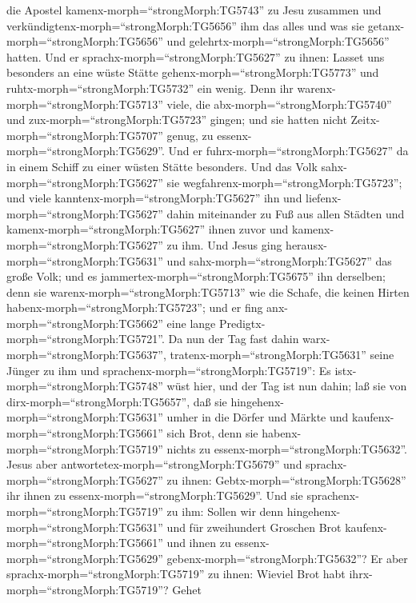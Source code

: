 die Apostel kamenx-morph=``strongMorph:TG5743'' zu Jesu zusammen und
verkündigtenx-morph=``strongMorph:TG5656'' ihm das alles und was sie
getanx-morph=``strongMorph:TG5656'' und
gelehrtx-morph=``strongMorph:TG5656'' hatten.  Und er
sprachx-morph=``strongMorph:TG5627'' zu ihnen: Lasset uns besonders an
eine wüste Stätte gehenx-morph=``strongMorph:TG5773'' und
ruhtx-morph=``strongMorph:TG5732'' ein wenig. Denn ihr
warenx-morph=``strongMorph:TG5713'' viele, die
abx-morph=``strongMorph:TG5740'' und zux-morph=``strongMorph:TG5723''
gingen; und sie hatten nicht Zeit\textbar x-morph=``strongMorph:TG5707''
genug, zu essenx-morph=``strongMorph:TG5629''.  Und er
fuhrx-morph=``strongMorph:TG5627'' da in einem Schiff zu einer wüsten
Stätte besonders.  Und das Volk
sahx-morph=``strongMorph:TG5627'' sie
wegfahrenx-morph=``strongMorph:TG5723''; und viele
kanntenx-morph=``strongMorph:TG5627'' ihn und
liefenx-morph=``strongMorph:TG5627'' dahin miteinander zu Fuß aus allen
Städten und kamenx-morph=``strongMorph:TG5627'' ihnen zuvor und
kamenx-morph=``strongMorph:TG5627'' zu ihm.  Und Jesus ging
herausx-morph=``strongMorph:TG5631'' und
sahx-morph=``strongMorph:TG5627'' das große Volk; und es
jammertex-morph=``strongMorph:TG5675'' ihn derselben; denn sie
warenx-morph=``strongMorph:TG5713'' wie die Schafe, die keinen Hirten
habenx-morph=``strongMorph:TG5723''; und er fing
anx-morph=``strongMorph:TG5662'' eine lange
Predigtx-morph=``strongMorph:TG5721''.  Da nun der Tag fast
dahin warx-morph=``strongMorph:TG5637'',
tratenx-morph=``strongMorph:TG5631'' seine Jünger zu ihm und
sprachenx-morph=``strongMorph:TG5719'': Es
istx-morph=``strongMorph:TG5748'' wüst hier, und der Tag ist nun dahin;
 laß sie von dirx-morph=``strongMorph:TG5657'', daß sie
hingehenx-morph=``strongMorph:TG5631'' umher in die Dörfer und Märkte
und kaufenx-morph=``strongMorph:TG5661'' sich Brot, denn sie
habenx-morph=``strongMorph:TG5719'' nichts zu
essenx-morph=``strongMorph:TG5632''.  Jesus aber
antwortetex-morph=``strongMorph:TG5679'' und
sprachx-morph=``strongMorph:TG5627'' zu ihnen:
Gebtx-morph=``strongMorph:TG5628'' ihr ihnen zu
essenx-morph=``strongMorph:TG5629''. Und sie
sprachenx-morph=``strongMorph:TG5719'' zu ihm: Sollen wir denn
hingehenx-morph=``strongMorph:TG5631'' und für zweihundert Groschen Brot
kaufenx-morph=``strongMorph:TG5661'' und ihnen zu
essenx-morph=``strongMorph:TG5629'' gebenx-morph=``strongMorph:TG5632''?
 Er aber sprachx-morph=``strongMorph:TG5719'' zu ihnen:
Wieviel Brot habt ihrx-morph=``strongMorph:TG5719''? Gehet
